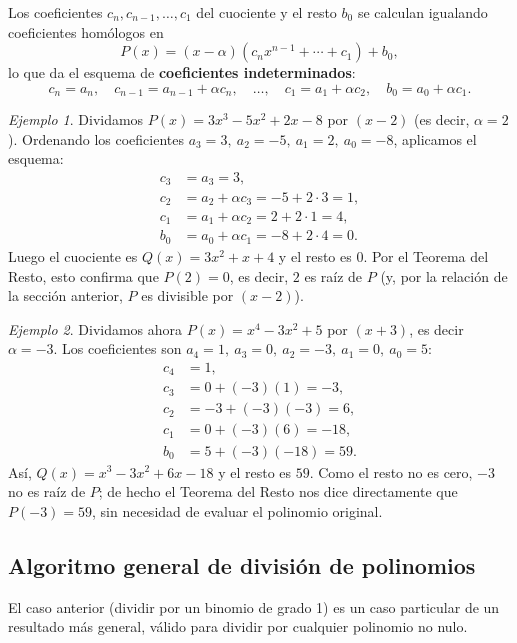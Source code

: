 \documentclass[11pt]{article}
\theoremstyle{remark}
\newtheorem*{ejemplo}{Ejemplo}
\begin{document}
Los coeficientes $c_n, c_{n-1}, \dots, c_1$ del cuociente y el resto $b_0$ se
calculan igualando coeficientes homólogos en
$$P(x) = (x-\alpha)(c_nx^{n-1} + \cdots + c_1) + b_0,$$
lo que da el esquema de \textbf{coeficientes indeterminados}:
$$c_n = a_n, \quad c_{n-1} = a_{n-1} + \alpha c_n, \quad \dots, \quad c_1 = a_1 + \alpha c_2, \quad b_0 = a_0 + \alpha c_1.$$

\begin{ejemplo}
Dividamos $P(x) = 3x^3 - 5x^2 + 2x - 8$ por $(x - 2)$ (es decir, $\alpha = 2$).
Ordenando los coeficientes $a_3=3,\ a_2=-5,\ a_1=2,\ a_0=-8$, aplicamos el
esquema:
\begin{align*}
c_3 &= a_3 = 3, \\
c_2 &= a_2 + \alpha c_3 = -5 + 2\cdot 3 = 1, \\
c_1 &= a_1 + \alpha c_2 = 2 + 2\cdot 1 = 4, \\
b_0 &= a_0 + \alpha c_1 = -8 + 2\cdot 4 = 0.
\end{align*}
Luego el cuociente es $Q(x) = 3x^2 + x + 4$ y el resto es $0$. Por el Teorema
del Resto, esto confirma que $P(2) = 0$, es decir, $2$ es raíz de $P$ (y, por
la relación de la sección anterior, $P$ es divisible por $(x-2)$).
\end{ejemplo}

\begin{ejemplo}
Dividamos ahora $P(x) = x^4 - 3x^2 + 5$ por $(x+3)$, es decir $\alpha = -3$.
Los coeficientes son $a_4=1,\ a_3=0,\ a_2=-3,\ a_1=0,\ a_0=5$:
\begin{align*}
c_4 &= 1, \\
c_3 &= 0 + (-3)(1) = -3, \\
c_2 &= -3 + (-3)(-3) = 6, \\
c_1 &= 0 + (-3)(6) = -18, \\
b_0 &= 5 + (-3)(-18) = 59.
\end{align*}
Así, $Q(x) = x^3 - 3x^2 + 6x - 18$ y el resto es $59$. Como el resto no es
cero, $-3$ no es raíz de $P$; de hecho el Teorema del Resto nos dice
directamente que $P(-3) = 59$, sin necesidad de evaluar el polinomio
original.
\end{ejemplo}

\subsection{Algoritmo general de división de polinomios}

El caso anterior (dividir por un binomio de grado 1) es un caso particular de
un resultado más general, válido para dividir por cualquier polinomio no
nulo.
\end{document}
